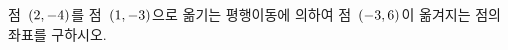 점~$(2{,}\mkern3mu\mathopen{}-4)$를 점~$(1{,}\mkern3mu\mathopen{}-3)$으로 옮기는 평행이동에 의하여 점~$(-3{,}\mkern3mu\mathopen{}6)$이 옮겨지는 점의 좌표를 구하시오.
